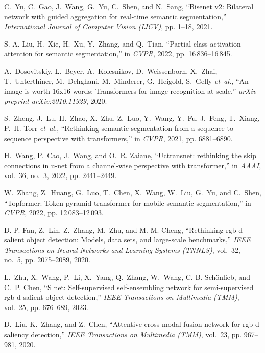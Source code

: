 \documentclass[10.5pt,twocolumn,journal,letterpaper]{IEEEtran}
\begin{document}
\begin{thebibliography}{10}
	C.~Yu, C.~Gao, J.~Wang, G.~Yu, C.~Shen, and N.~Sang, ``Bisenet v2: Bilateral
	network with guided aggregation for real-time semantic segmentation,''
	\emph{International Journal of Computer Vision (IJCV)}, pp. 1--18, 2021.
	
	S.-A. Liu, H.~Xie, H.~Xu, Y.~Zhang, and Q.~Tian, ``Partial class activation
	attention for semantic segmentation,'' in \emph{CVPR}, 2022, pp.
	16\,836--16\,845.
	
	A.~Dosovitskiy, L.~Beyer, A.~Kolesnikov, D.~Weissenborn, X.~Zhai,
	T.~Unterthiner, M.~Dehghani, M.~Minderer, G.~Heigold, S.~Gelly \emph{et~al.},
	``An image is worth 16x16 words: Transformers for image recognition at
	scale,'' \emph{arXiv preprint arXiv:2010.11929}, 2020.
	
	S.~Zheng, J.~Lu, H.~Zhao, X.~Zhu, Z.~Luo, Y.~Wang, Y.~Fu, J.~Feng, T.~Xiang,
	P.~H. Torr \emph{et~al.}, ``Rethinking semantic segmentation from a
	sequence-to-sequence perspective with transformers,'' in \emph{CVPR}, 2021,
	pp. 6881--6890.
	
	H.~Wang, P.~Cao, J.~Wang, and O.~R. Zaiane, ``Uctransnet: rethinking the skip
	connections in u-net from a channel-wise perspective with transformer,'' in
	\emph{AAAI}, vol.~36, no.~3, 2022, pp. 2441--2449.
	
	W.~Zhang, Z.~Huang, G.~Luo, T.~Chen, X.~Wang, W.~Liu, G.~Yu, and C.~Shen,
	``Topformer: Token pyramid transformer for mobile semantic segmentation,'' in
	\emph{CVPR}, 2022, pp. 12\,083--12\,093.
	
	D.-P. Fan, Z.~Lin, Z.~Zhang, M.~Zhu, and M.-M. Cheng, ``Rethinking rgb-d
	salient object detection: Models, data sets, and large-scale benchmarks,''
	\emph{IEEE Transactions on Neural Networks and Learning Systems (TNNLS)},
	vol.~32, no.~5, pp. 2075--2089, 2020.
	
	L.~Zhu, X.~Wang, P.~Li, X.~Yang, Q.~Zhang, W.~Wang, C.-B. Sch{\"o}nlieb, and
	C.~P. Chen, ``S net: Self-supervised self-ensembling network for
	semi-supervised rgb-d salient object detection,'' \emph{IEEE Transactions on
		Multimedia (TMM)}, vol.~25, pp. 676--689, 2023.
	
	D.~Liu, K.~Zhang, and Z.~Chen, ``Attentive cross-modal fusion network for rgb-d
	saliency detection,'' \emph{IEEE Transactions on Multimedia (TMM)}, vol.~23,
	pp. 967--981, 2020.
	

\end{thebibliography}
\end{document}
